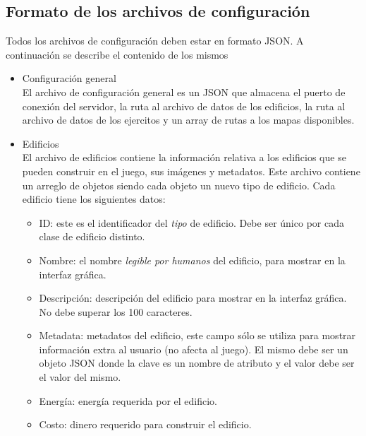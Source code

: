 \documentclass[titlepage,a4paper,12pt]{article}
\begin{document}
\subsection{Formato de los archivos de configuración}

Todos los archivos de configuración deben estar en formato JSON. A continuación se describe el contenido de los mismos

\begin{itemize}

\item Configuración general\\

El archivo de configuración general es un JSON que almacena el puerto de conexión del servidor, la ruta al archivo de datos de los edificios, la ruta al archivo de datos de los ejercitos y un array de rutas a los mapas disponibles.

\item Edificios\\

El archivo de edificios contiene la información relativa a los edificios que se pueden construir en el juego, sus imágenes y metadatos. Este archivo contiene un arreglo de objetos siendo cada objeto un nuevo tipo de edificio. Cada edificio tiene los siguientes datos: 

\begin{itemize}

\item ID:  este es el identificador del \textit{tipo} de edificio. Debe ser único por cada clase de edificio distinto.

\item Nombre: el nombre \textit{legible por humanos} del edificio, para mostrar en la interfaz gráfica.

\item Descripción: descripción del edificio para mostrar en la interfaz gráfica. No debe superar los 100 caracteres.

\item Metadata: metadatos del edificio, este campo sólo se utiliza para mostrar información extra al usuario (no afecta al juego). El mismo debe ser un objeto JSON donde la clave es un nombre de atributo y el valor debe ser el valor del mismo.

\item Energía: energía requerida por el edificio.

\item Costo: dinero requerido para construir el edificio.


\end{itemize}
\end{itemize}
\end{document}
